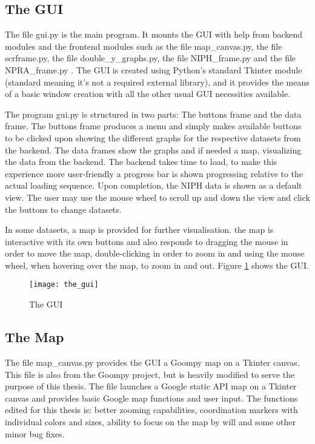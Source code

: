 \subsection{The GUI}
The file gui.py is the main program. It mounts the GUI with help from backend modules and the frontend modules such as the file map\_canvas.py, the file scrframe.py, the file double\_y\_graphs.py, the file NIPH\_frame.py and the file NPRA\_frame.py . The GUI is created using Python's standard Tkinter module (standard meaning it's not a required external library), and it provides the means of a basic window creation with all the other usual GUI necessities available. 

The program gui.py is structured in two parts: The buttons frame and the data frame. The buttons frame produces a menu and simply makes available buttons to be clicked upon showing the different graphs for the respective datasets from the backend. The data frames show the graphs and if needed a map, visualizing the data from the backend. The backend takes time to load, to make this experience more user-friendly a progress bar is shown progressing relative to the actual loading sequence. Upon completion, the NIPH data is shown as a default view. The user may use the mouse wheel to scroll up and down the view and click the buttons to change datasets. 

In some datasets, a map is provided for further visualisation. the map is interactive with its own buttons and also responds to dragging the mouse in order to move the map, double-clicking in order to zoom in and using the mouse wheel, when hovering over the map, to zoom in and out. Figure \ref{fig:the_gui} shows the GUI.

\begin{figure}[!htb]
\texttt{[image: the\_gui]}
\centering
\caption{The GUI}
\label{fig:the_gui}
\end{figure}



\subsection{The Map}
The file map\_canvas.py provides the GUI a Goompy\cite{goompy} map on a Tkinter canvas. This file is also from the Goompy project, but is heavily modified to serve the purpose of this thesis. The file launches a Google static API map on a Tkinter canvas and provides basic Google map functions and user input. The functions edited for this thesis is: better zooming capabilities, coordination markers with individual colors and sizes, ability to focus on the map by will and some other minor bug fixes.

